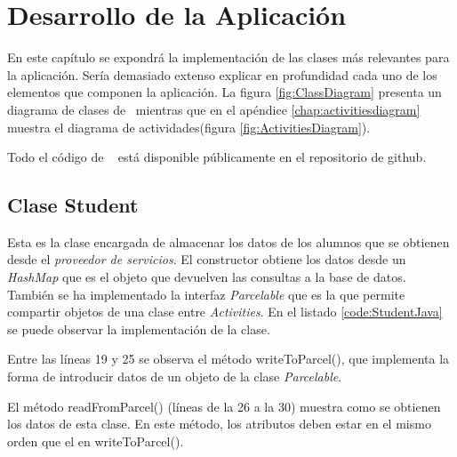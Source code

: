 %
%
%
%

\cleardoublepage
\chapter{Desarrollo de la Aplicación}
\label{chap:developing}

	En este capítulo se expondrá la implementación de las clases más relevantes para la aplicación.
	Sería demasiado extenso explicar en profundidad cada uno de los elementos que componen la aplicación.
	La figura \ref{fig:ClassDiagram} presenta un diagrama de clases de \CollegeApp\ mientras que en el apéndice \ref{chap:activitiesdiagram} muestra el diagrama de actividades(figura \ref{fig:ActivitiesDiagram}).
	
	\bigskip
	Todo el código de \CollegeApp\ \cite{28:mirepo:online} está disponible públicamente en el repositorio de github.
	
	\section{Clase {\ttfamily Student}} \label{sec:Student}
	
		Esta es la clase encargada de almacenar los datos de los alumnos que se obtienen desde el {\it proveedor de servicios}.
		El constructor obtiene los datos desde un {\it HashMap} \cite{10:hashmap:online} que es el objeto que devuelven las consultas a la base de datos. También se ha implementado la interfaz {\it Parcelable} \cite{11:parcelable:online} que es la que permite compartir objetos de una clase entre {\it Activities}. 
		En el listado \ref{code:StudentJava} se puede observar la implementación de la clase.
		
		
		
		\bigskip
		Entre las líneas 19 y 25 se observa el método {\ttfamily writeToParcel()}, que implementa la forma de introducir datos de un objeto de la clase {\it Parcelable}.
		
		El método {\ttfamily readFromParcel()} (líneas de la 26 a la 30) muestra como se obtienen los datos de esta clase. En este método, los atributos deben estar en el mismo orden que el en {\ttfamily writeToParcel()}.
		
